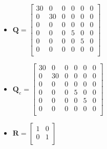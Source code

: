 \documentclass{thesisreport}
\begin{document}
\begin{multicols}{2}
\begin{itemize}
            \end{itemize}
			\columnbreak
            \begin{itemize}
            	\item $\bm{Q} = \begin{bmatrix}
                 30 & 0  & 0 & 0 & 0 & 0 \\
                 0 & 30  & 0 & 0 & 0 & 0 \\
                 0 & 0  & 0 & 0 & 0 & 0 \\
                 0 & 0  & 0 & 5 & 0 & 0 \\
                 0 & 0  & 0 & 0 & 5 & 0 \\
                 0 & 0  & 0 & 0 & 0 & 0 \\
                \end{bmatrix}$
                
                \item $\bm{Q}_e = \begin{bmatrix}
                 30 & 0  & 0 & 0 & 0 & 0 \\
                 0 & 30  & 0 & 0 & 0 & 0 \\
                 0 & 0  & 0 & 0 & 0 & 0 \\
                 0 & 0  & 0 & 5 & 0 & 0 \\
                 0 & 0  & 0 & 0 & 5 & 0 \\
                 0 & 0  & 0 & 0 & 0 & 0 \\
                \end{bmatrix}$
                
                \item $\bm{R} = \begin{bmatrix}
                1 & 0 \\
                0 & 1 \\
                \end{bmatrix}$
                
            \end{itemize}
\end{multicols}
\end{document}
